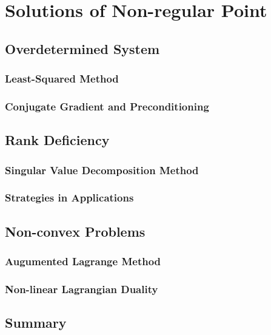 \chapter{Solutions of Non-regular Point}
\label{cha:result}




\section{Overdetermined System}
\subsection{Least-Squared Method}


\subsection{Conjugate Gradient and Preconditioning}

\section{Rank Deficiency}
\subsection{Singular Value Decomposition Method}
\subsection{Strategies in Applications}

\section{Non-convex Problems}
\subsection{Augumented Lagrange Method}
\subsection{Non-linear Lagrangian Duality}





\section{Summary}
